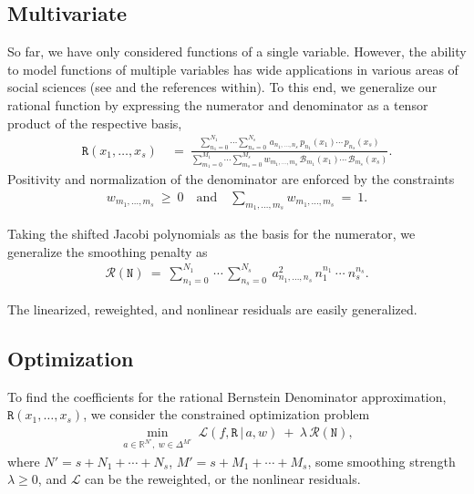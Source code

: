 \documentclass{article}
\newcommand{\NN}{{\mathtt N}}
\newcommand{\RR}{{\mathtt R}}
\begin{document}
\subsection{Multivariate}
So far, we have only considered functions of a single variable. However, the ability to model functions of multiple variables has wide applications in various areas of social sciences (see \cite{spatial_regression_modeling} and the references within). To this end, we generalize our rational function by expressing the numerator and denominator as a tensor product of the respective basis,
\begin{align}\label{eq:multivariate_rational_polynomil}
    \RR(x_1,\ldots, x_s)\ &=\ \frac{\sum_{n_1=0}^{N_1}\cdots\sum_{n_s=0}^{N_s}\, a_{n_1,\ldots, n_s}\, p_{n_1}(x_1)\cdots \, p_{n_s}(x_s)}{\sum_{m_1=0}^{M_1}\cdots \sum_{m_s=0}^{M_s} w_{m_1,\ldots, m_s}\, \mathcal{B}_{m_1}(x_1)\cdots \, \mathcal{B}_{m_s}(x_s)}.
\end{align}
Positivity and normalization of the denominator are enforced by the constraints
\begin{align}
    w_{m_1,\ldots, m_s}\ \geq\ 0\quad\text{and}\quad \sum_{m_1,\ldots, m_s} w_{m_1,\ldots, m_s}\ = \ 1.
\end{align}

Taking the shifted Jacobi polynomials as the basis for the numerator, we generalize the smoothing penalty as
\begin{align}\label{eq:multivariate_smoothing_penalty}
    \mathcal{R}(\NN)\ =\ \sum_{n_1=0}^{N_1}\, \cdots\, \sum_{n_s=0}^{N_s}\ a_{n_1,\ldots, n_s}^2\, n_1^{n_1}\ \cdots\ n_s^{n_s}.
\end{align}

The linearized, reweighted, and nonlinear residuals are easily generalized.

\subsection{Optimization}\label{sec:optimization}
To find the coefficients for the rational Bernstein Denominator approximation, $\RR(x_1,\ldots, x_s)$, we consider the constrained optimization problem
\begin{eqnarray}
    \min_{{a\in\mathbb{R}^{{N}'},\ w\in\Delta^{{M}'}}}\ \mathcal{L}(f, \RR\, |\, a, w)\ +\ \lambda\, \mathcal{R}(\NN),
\end{eqnarray}
where ${N}'=s + N_1+\cdots+N_s$, ${M}'=s + M_1+\cdots+M_s$, some smoothing strength $\lambda \geq 0$, and $\mathcal{L}$ can be the reweighted, or the nonlinear residuals.
\end{document}
